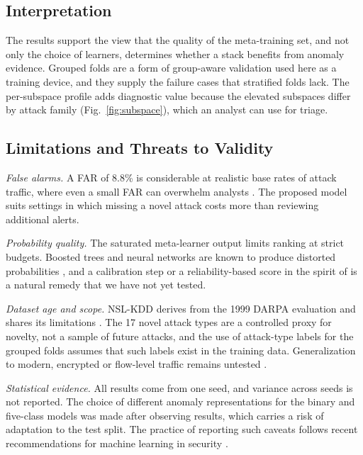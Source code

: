\documentclass[journal]{IEEEtran}
\begin{document}
\subsection{Interpretation}
The results support the view that the quality of the meta-training set, and not only the choice of learners, determines whether a stack benefits from anomaly evidence. Grouped folds are a form of group-aware validation \cite{roberts2017} used here as a training device, and they supply the failure cases that stratified folds lack. The per-subspace profile adds diagnostic value because the elevated subspaces differ by attack family (Fig.~\ref{fig:subspace}), which an analyst can use for triage.

\subsection{Limitations and Threats to Validity}
\emph{False alarms.} A FAR of 8.8\% is considerable at realistic base rates of attack traffic, where even a small FAR can overwhelm analysts \cite{axelsson2000}. The proposed model suits settings in which missing a novel attack costs more than reviewing additional alerts.

\emph{Probability quality.} The saturated meta-learner output limits ranking at strict budgets. Boosted trees and neural networks are known to produce distorted probabilities \cite{niculescu2005,guo2017}, and a calibration step or a reliability-based score in the spirit of \cite{hendrycks2017} is a natural remedy that we have not yet tested.

\emph{Dataset age and scope.} NSL-KDD derives from the 1999 DARPA evaluation and shares its limitations \cite{mchugh2000,mahoney2003}. The 17 novel attack types are a controlled proxy for novelty, not a sample of future attacks, and the use of attack-type labels for the grouped folds assumes that such labels exist in the training data. Generalization to modern, encrypted or flow-level traffic remains untested \cite{ring2019,engelen2021}.

\emph{Statistical evidence.} All results come from one seed, and variance across seeds is not reported. The choice of different anomaly representations for the binary and five-class models was made after observing results, which carries a risk of adaptation to the test split. The practice of reporting such caveats follows recent recommendations for machine learning in security \cite{arp2022,sommer2010}.

\end{document}
